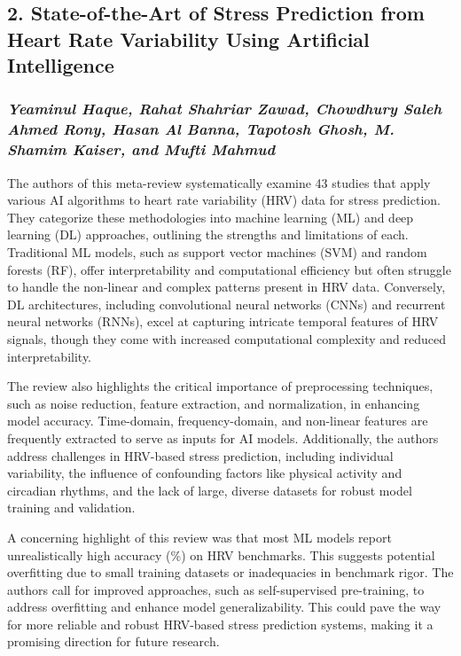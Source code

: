 \documentclass[letterpaper,12pt]{article}
\begin{document}
\newpage
\subsection*{2. State-of-the-Art of Stress Prediction from Heart Rate Variability Using Artificial Intelligence}
\subsubsection*{\textbf{\textit{Yeaminul Haque, Rahat Shahriar Zawad, Chowdhury Saleh Ahmed Rony, Hasan Al Banna, Tapotosh Ghosh, M. Shamim Kaiser, and Mufti Mahmud}}}

The authors of this meta-review systematically examine 43 studies that apply
various AI algorithms to heart rate variability (HRV) data for stress
prediction. They categorize these methodologies into machine learning (ML) and
deep learning (DL) approaches, outlining the strengths and limitations of each.
Traditional ML models, such as support vector machines (SVM) and random forests
(RF), offer interpretability and computational efficiency but often struggle to
handle the non-linear and complex patterns present in HRV data. Conversely, DL
architectures, including convolutional neural networks (CNNs) and recurrent
neural networks (RNNs), excel at capturing intricate temporal features of HRV
signals, though they come with increased computational complexity and reduced
interpretability.

The review also highlights the critical importance of preprocessing techniques,
such as noise reduction, feature extraction, and normalization, in enhancing
model accuracy. Time-domain, frequency-domain, and non-linear features are
frequently extracted to serve as inputs for AI models. Additionally, the
authors address challenges in HRV-based stress prediction, including individual
variability, the influence of confounding factors like physical activity and
circadian rhythms, and the lack of large, diverse datasets for robust model
training and validation.

A concerning highlight of this review was that most ML models report
unrealistically high accuracy (\%) on HRV benchmarks. This suggests
potential overfitting due to small training datasets or inadequacies in
benchmark rigor. The authors call for improved approaches, such as
self-supervised pre-training, to address overfitting and enhance model
generalizability. This could pave the way for more reliable and robust
HRV-based stress prediction systems, making it a promising direction for future
research.
\end{document}
